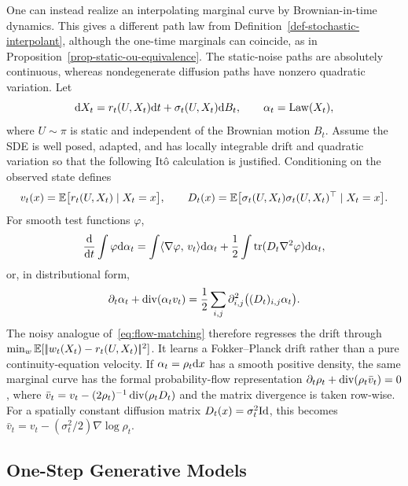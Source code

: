 \begin{rem}\label{rem-noisy-stochastic-interpolants}
One can instead realize an interpolating marginal curve by Brownian-in-time dynamics. This gives a different path law from Definition~\ref{def-stochastic-interpolant}, although the one-time marginals can coincide, as in Proposition~\ref{prop-static-ou-equivalence}. The static-noise paths are absolutely continuous, whereas nondegenerate diffusion paths have nonzero quadratic variation. Let
\[
	\mathrm{d} X_t=r_t(U,X_t)\mathrm{d} t+\sigma_t(U,X_t)\mathrm{d} B_t,
	\qquad \alpha_t=\operatorname{Law}(X_t),
\]
where $U\sim\pi$ is static and independent of the Brownian motion $B_t$. Assume the SDE is well posed, adapted, and has locally integrable drift and quadratic variation so that the following It\^o calculation is justified. Conditioning on the observed state defines
\[
	v_t(x)=\mathbb{E}\bigl[r_t(U,X_t)\mid X_t=x\bigr],
	\qquad
	D_t(x)=\mathbb{E}\bigl[\sigma_t(U,X_t)\sigma_t(U,X_t)^\top\mid X_t=x\bigr].
\]
For smooth test functions $\varphi$,
\[
	\frac{\mathrm{d}}{\mathrm{d} t}\int\varphi\mathrm{d}\alpha_t
	=
	\int\langle \nabla\varphi,\,v_t\rangle\mathrm{d}\alpha_t
	+
	\frac12\int\operatorname{tr}(D_t\nabla^2\varphi)\mathrm{d}\alpha_t,
\]
or, in distributional form,
\begin{equation}\label{eq:noisy-interpolant-fokker-planck}
	\partial_t\alpha_t+\operatorname{div}(\alpha_tv_t)
	=
	\frac12\sum_{i,j}\partial_{i,j}^2\bigl((D_t)_{i,j}\alpha_t\bigr).
\end{equation}
The noisy analogue of~\eqref{eq:flow-matching} therefore regresses the drift through $\min_w\mathbb{E}[|\!| w_t(X_t)-r_t(U,X_t) |\!|^2]$. It learns a Fokker--Planck drift rather than a pure continuity-equation velocity. If $\alpha_t=\rho_t\mathrm{d} x$ has a smooth positive density, the same marginal curve has the formal probability-flow representation $\partial_t\rho_t+\operatorname{div}(\rho_t\bar v_t)=0$, where $\bar v_t=v_t-(2\rho_t)^{-1}\operatorname{div}(\rho_tD_t)$ and the matrix divergence is taken row-wise. For a spatially constant diffusion matrix $D_t(x)=\sigma_t^2\mathrm{Id}$, this becomes $\bar v_t=v_t-(\sigma_t^2/2)\nabla\log\rho_t$.
\end{rem}


\subsection{One-Step Generative Models}
\label{sec-one-step-generative-models}

